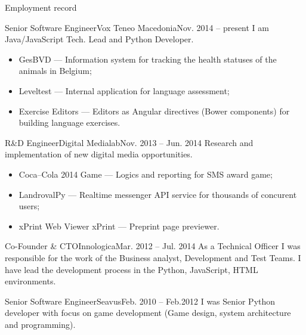 \documentclass[]{mcdowellcv}
\begin{document}
    \makeheader
    \begin{cvsection}{Employment record}
        \begin{cvsubsection}{Senior Software Engineer}{Vox Teneo Macedonia}{Nov. 2014 -- present}
            I am Java/JavaScript Tech. Lead and Python Developer.
            \begin{itemize}
                \item GesBVD --- Information system for tracking the health statuses of the animals in Belgium;
                \item Leveltest --- Internal application for language assessment;
                \item Exercise Editors --- Editors as Angular directives (Bower components) for building language exercises.
            \end{itemize}
        \end{cvsubsection}
        \begin{cvsubsection}{R\&D Engineer}{Digital Medialab}{Nov. 2013 -- Jun. 2014}
            Research and implementation of new digital media opportunities.
            \begin{itemize}
                \item Coca--Cola 2014 Game --- Logics and reporting for SMS award game;
                \item LandrovalPy --- Realtime messenger API service for thousands of concurent users;
                \item xPrint Web Viewer {xPrint} --- Preprint page previewer.
            \end{itemize}
        \end{cvsubsection}
        \begin{cvsubsection}{Co-Founder \& CTO}{Innologica}{Mar. 2012 -- Jul. 2014}
            As a Technical Officer I was responsible for the work of the Business analyst, Development and Test Teams.\linebreak
            I have lead the development process in the Python, JavaScript, HTML environments.
        \end{cvsubsection}
        \begin{cvsubsection}{Senior Software Engineer}{Seavus}{Feb. 2010 -- Feb.2012}
            I was Senior Python developer with focus on game development (Game design, system architecture and programming).

\end{cvsubsection}
\end{cvsection}
\end{document}
